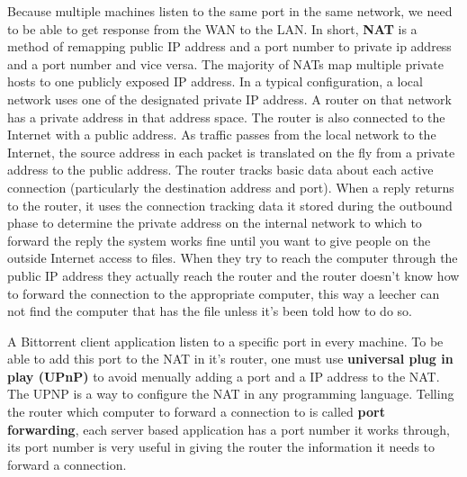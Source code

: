 \documentclass[11pt]{article}
\begin{document}
  \begin{flushleft}

    Because multiple machines listen to the same port in the same network, we need to be able to get response from the WAN to the LAN. In short, \textbf{NAT} is a method of remapping public IP address and a port number to private ip address and a port number and vice versa. The majority of NATs map multiple private hosts to one publicly exposed IP address. In a typical configuration, a local network uses one of the designated private IP address. A router on that network has a private address in that address space. The router is also connected to the Internet with a public address. As traffic passes from the local network to the Internet, the source address in each packet is translated on the fly from a private address to the public address. The router tracks basic data about each active connection (particularly the destination address and port). When a reply returns to the router, it uses the connection tracking data it stored during the outbound phase to determine the private address on the internal network to which to forward the reply the system works fine until you want to give people on the outside Internet access to files. When they try to reach the computer through the public IP address they actually reach the router and the router doesn't know how to forward the connection to the appropriate computer, this way a leecher can not find the computer that has the file unless it's been told how to do so.

    A Bittorrent client application listen to a specific port in every machine. To be able to add this port to the NAT in it's router, one must use \textbf{universal plug in play (UPnP)} to avoid menually adding a port and a IP address to the NAT. The UPNP is a way to configure the NAT in any programming language. Telling the router which computer to forward a connection to is called \textbf{port forwarding}, each server based application has a port number it works through, its port number is very useful in giving the router the information it needs to forward a connection.

  \end{flushleft}
\end{document}
